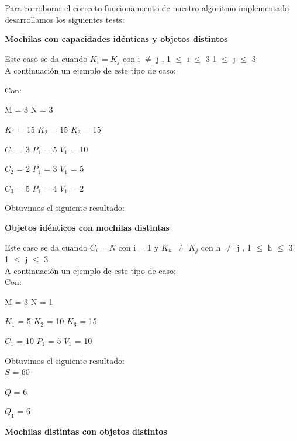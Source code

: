 \indent Para corroborar el correcto funcionamiento de nuestro algoritmo implementado desarrollamos los siguientes tests:\\


\begin{center}
 \textbf{Mochilas con capacidades id\'enticas y objetos distintos}
\end{center}

Este caso se da cuando $K_{i} = K_{j}$ con i $\neq$ j , 1 $\leq$ i $\leq$ 3  1 $\leq$ j $\leq$ 3  \\

A continuaci\'on un ejemplo de este tipo de caso:

Con:

M = 3 N = 3

$K_{1}$ = 15  $K_{2}$ = 15  $K_{3}$ = 15 

$C_{1}$ = 3 $P_{1}$ = 5 $V_{1}$ = 10

$C_{2}$ = 2 $P_{1}$ = 3 $V_{1}$ = 5

$C_{3}$ = 5 $P_{1}$ = 4 $V_{1}$ = 2
  
  \indent  
  
  Obtuvimos el siguiente resultado:\\


\begin{center}
 \textbf{Objetos id\'enticos con mochilas distintas}
\end{center}

Este caso se da cuando $C_{i} = N$ con i = 1 y $K_{h}$ $\neq$ $K_{j}$ con h $\neq$ j , 1 $\leq$ h $\leq$ 3  1 $\leq$ j $\leq$ 3 \\

A continuaci\'on un ejemplo de este tipo de caso:\\

 Con:
 
 M = 3 N = 1
 
 $K_{1}$ = 5  $K_{2}$ = 10  $K_{3}$ = 15
 
 $C_{1}$ = 10 $P_{1}$ = 5 $V_{1}$ = 10
  
  \indent  
  
  Obtuvimos el siguiente resultado:\\

$S$ = 60

$Q$ = 6

$Q_{1}$ = 6


\begin{center}
 \textbf{Mochilas distintas con objetos distintos}
\end{center}


